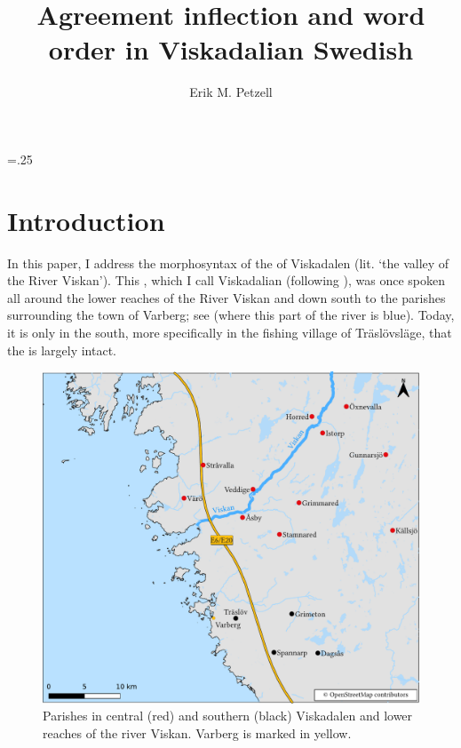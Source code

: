 \documentclass[output=paper,colorlinks,citecolor=brown,draft,draftmode]{langscibook}
\author{Erik M. Petzell\orcid{}\affiliation{Institute for Language and Folklore, Gothenburg}}
\title{Agreement inflection and word order in Viskadalian Swedish}
\begin{document}
\multicolsep=.25\baselineskip
\maketitle


\section{Introduction}\label{sec:petzell:1}


In this paper, I address the morphosyntax of the   of Viskadalen (lit. ‘the valley of the River Viskan’). This , which I call Viskadalian (following \citealt{Petzell2017}), was once spoken all around the lower reaches of the River Viskan and down south to the parishes surrounding the town of Varberg; see  (where this part of the river is blue). Today, it is only in the south, more specifically in the fishing village of Träslövsläge, that the  is largely intact. 

\begin{figure}
\includegraphics[width=\textwidth]{figures/lmswe-latest-compressed.pdf}
\caption{\label{figmap:petzell:1}\label{figmap:petzell:2}Parishes in central (red) and southern (black) Viskadalen and lower reaches of the river Viskan. Varberg is marked in yellow.}
\end{figure}
\end{document}
